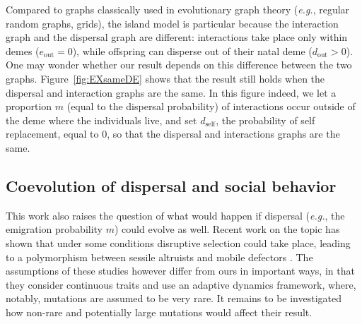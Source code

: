 \documentclass[11pt, letterpaper]{article}
\newcommand{\eg}{\textit{e.g.}}
\newcommand{\self}{\textrm{self}}
\newcommand{\out}{\textrm{out}}
\newcommand{\eout}{e_{\out}}
\newcommand{\dself}{d_{\self}}
\newcommand{\dout}{d_{\out}}
\begin{document}
Compared to graphs classically used in evolutionary graph theory (\eg, regular random graphs, grids), the island model is particular because the interaction graph and the dispersal graph are different: interactions take place only within demes ($\eout = 0$), while offspring can disperse out of their natal deme ($\dout >0$). One may wonder whether our result depends on this difference between the two graphs. Figure~\ref{fig:EXsameDE} shows that the result still holds when the dispersal and interaction graphs are the same. In this figure indeed, we let a proportion $m$ (equal to the dispersal probability) of interactions occur outside of the deme where the individuals live, and set $\dself$, the probability of self replacement, equal to $0$, so that the dispersal and interactions graphs are the same. 

\subsection*{Coevolution of dispersal and social behavior}
This work also raises the question of what would happen if dispersal (\eg, the emigration probability $m$) could evolve as well. Recent work on the topic has shown that under some conditions disruptive selection could take place, leading to a polymorphism between sessile altruists and mobile defectors \citep{Parvinen2013, MullonKL2017bioRxiv}. The assumptions of these studies however  differ from ours in important ways, in that they consider continuous traits and use an adaptive dynamics framework, where, notably, mutations are assumed to be very rare. It remains to be investigated how non-rare and potentially large mutations would affect their result. 


\singlespacing
\clearpage


\doublespacing

\processdelayedfloats

\makeatletter
\efloat@restorefloats
\makeatother


\clearpage


\appendix
 
\renewcommand{\theequation}{\thesection.\arabic{equation}}
\setcounter{equation}{0}  %
 
\renewcommand{\thefigure}{S\arabic{figure}}
\setcounter{figure}{0}
\end{document}
